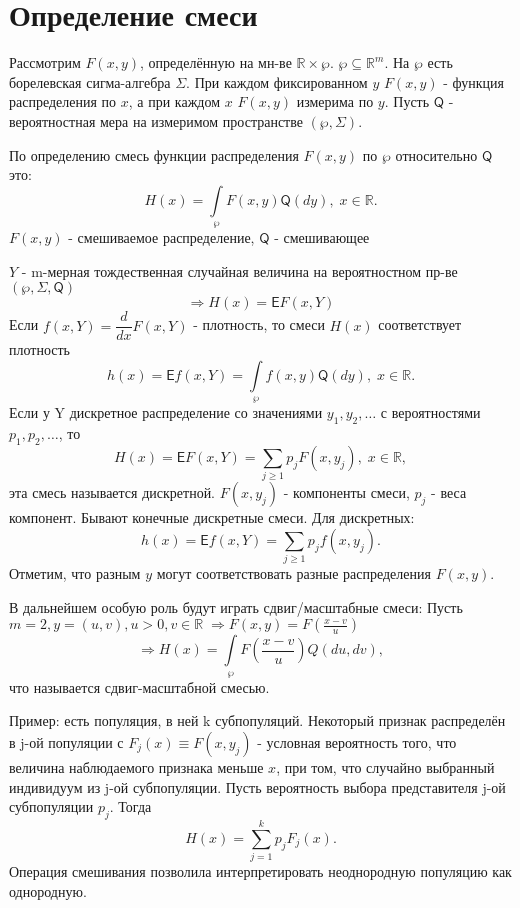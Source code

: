 \documentclass[11pt]{article}
\begin{document}
\section{Определение смеси}
Рассмотрим $F(x, y)$, определённую на мн-ве $\mathbb{R} \times 	\wp $. $ \wp \subseteq \mathbb{R}^m$.
На $\wp$ есть борелевская сигма-алгебра $\Sigma$. При каждом фиксированном $y$ $F(x, y)$ - функция распределения по $x$, а при каждом $x$ $F(x, y)$ измерима по $y$. Пусть $\mathsf{Q}$ - вероятностная мера на измеримом пространстве $\left( \wp, \Sigma \right)$.

По определению смесь функции распределения $F(x, y)$ по $\wp$ относительно $\mathsf{Q}$ это:
$$
H(x) = \int\limits_{\wp} F(x, y)\mathsf{Q}(dy), \; x \in \mathbb{R}.
$$
$F(x, y)$ - смешиваемое распределение, $\mathsf{Q}$ - смешивающее

$Y$ - m-мерная тождественная случайная величина на вероятностном пр-ве $\left( \wp, \Sigma, \mathsf{Q} \right)$
$$
\Rightarrow H(x) = \mathsf{E}F(x, Y)
$$
Если $f(x, Y) = \dfrac{d}{dx}F(x, Y)$ - плотность, то смеси $H(x)$ соответствует плотность
$$
h(x) = \mathsf{E}f(x, Y) = \int\limits_{\wp} f(x, y)\mathsf{Q}(dy), \; x \in \mathbb{R}.
$$
Если у Y дискретное распределение со значениями $y_1, y_2, \ldots$ с вероятностями $p_1, p_2, \ldots$, то
$$
H(x) = \mathsf{E}F(x, Y) = \sum\limits_{j \geqslant 1} p_j F(x, y_j), \; x \in \mathbb{R},
$$
эта смесь называется дискретной. $F(x, y_j)$ - компоненты смеси, $p_j$ - веса компонент. Бывают конечные дискретные смеси.
Для дискретных:
$$
h(x) = \mathsf{E}f(x, Y) = \sum\limits_{j \geqslant 1} p_j f(x, y_j).
$$
Отметим, что разным $y$ могут соответствовать разные распределения $F(x, y)$.

В дальнейшем особую роль будут играть сдвиг/масштабные смеси:
Пусть $m = 2, y = (u, v), u > 0, v \in \mathbb{R} \; \Rightarrow F(x, y) = F\left(\frac{x - v}{u}\right)$
$$
\Rightarrow H(x) = \int\limits_{\wp} F\left( \dfrac{x - v}{u} \right) Q(du, dv),
$$
что называется сдвиг-масштабной смесью.

Пример: есть популяция, в ней k субпопуляций. Некоторый признак распределён в j-ой популяции с $F_j(x) \equiv F(x, y_j)$ - условная вероятность того, что величина наблюдаемого признака меньше $x$, при том, что случайно выбранный индивидуум из j-ой субпопуляции. Пусть вероятность выбора представителя j-ой субпопуляции $p_j$. Тогда
$$
H(x) = \sum\limits_{j = 1}^{k} p_j F_j(x).
$$
Операция смешивания позволила интерпретировать неоднородную популяцию как однородную.
\end{document}
